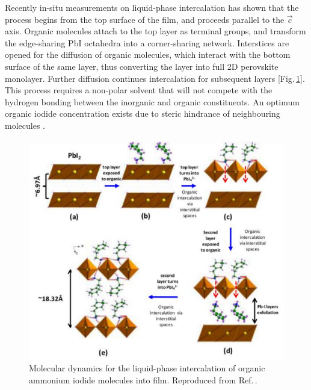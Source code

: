 Recently in-situ measurements on liquid-phase intercalation has shown that the process begins from the top surface of the  film, and proceeds parallel to the $\vec{c}$ axis. Organic molecules attach to the top  layer as terminal groups, and transform the edge-sharing PbI octahedra into a corner-sharing network. Interstices are opened for the diffusion of organic molecules, which interact with the bottom surface of the same layer, thus converting the  layer into full 2D perovskite monolayer. Further diffusion continues intercalation for subsequent layers [Fig.\,\ref{2Fig7}]. This process requires a non-polar solvent that will not compete with the hydrogen bonding between the inorganic and organic constituents. An optimum organic iodide concentration exists due to steric hindrance of neighbouring molecules \cite{Ahmad2014}.
\begin{figure} [h!]
\centering
\includegraphics[width=\textwidth]{Fig7}
\caption{Molecular dynamics for the liquid-phase intercalation of organic ammonium iodide molecules into  film. Reproduced from Ref.\,\cite{Ahmad2014}.}
\label{2Fig7}
\end{figure}

